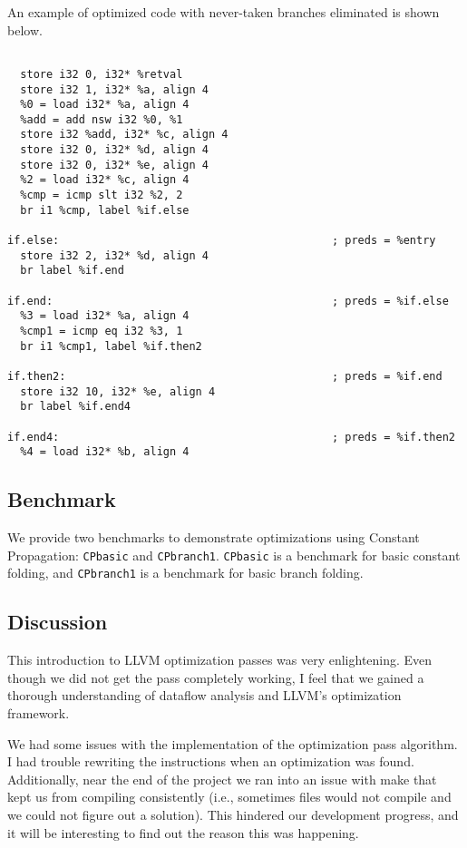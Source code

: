 An example of optimized code with never-taken branches eliminated is shown below.

\begin{verbatim}

  store i32 0, i32* %retval
  store i32 1, i32* %a, align 4
  %0 = load i32* %a, align 4
  %add = add nsw i32 %0, %1
  store i32 %add, i32* %c, align 4
  store i32 0, i32* %d, align 4
  store i32 0, i32* %e, align 4
  %2 = load i32* %c, align 4
  %cmp = icmp slt i32 %2, 2
  br i1 %cmp, label %if.else

if.else:                                          ; preds = %entry
  store i32 2, i32* %d, align 4
  br label %if.end

if.end:                                           ; preds = %if.else
  %3 = load i32* %a, align 4
  %cmp1 = icmp eq i32 %3, 1
  br i1 %cmp1, label %if.then2

if.then2:                                         ; preds = %if.end
  store i32 10, i32* %e, align 4
  br label %if.end4

if.end4:                                          ; preds = %if.then2
  %4 = load i32* %b, align 4
\end{verbatim}

\subsection{Benchmark}

We provide two benchmarks to demonstrate optimizations using Constant Propagation: \texttt{CPbasic} and \texttt{CPbranch1}. \texttt{CPbasic} is a benchmark for basic constant folding, and \texttt{CPbranch1} is a benchmark for basic branch folding. 

\subsection{Discussion}

This introduction to LLVM optimization passes was very enlightening. Even though we did not get the pass completely working, I feel that we gained a thorough understanding of dataflow analysis and LLVM's optimization framework. 

We had some issues with the implementation of the optimization pass algorithm. I had trouble rewriting the instructions when an optimization was found. Additionally, near the end of the project we ran into an issue with make that kept us from compiling consistently (i.e., sometimes files would not compile and we could not figure out a solution). This hindered our development progress, and it will be interesting to find out the reason this was happening. 